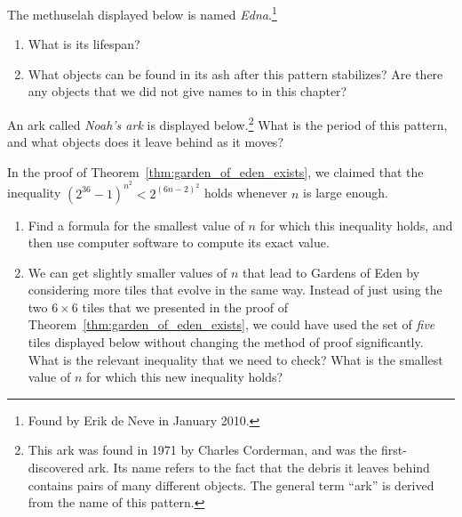 \begin{multicols}{2}
\mfilbreak


\begin{problem}\label{exer:edna}
The methuselah displayed below is named \emph{Edna}.\footnote{Found by Erik de Neve in January 2010.}

\begin{center}
\end{center}

\begin{enumerate}[label=\bf\color{ocre}(\alph*)]
	\item What is its lifespan?
	
	\item What objects can be found in its ash after this pattern stabilizes? Are there any objects that we did not give names to in this chapter?
\end{enumerate}
\end{problem}


\mfilbreak


\begin{problem}\label{exer:noahs_ark}
	An ark called \emph{Noah's ark} is displayed below.\footnote{This ark was found in 1971 by Charles Corderman, and was the first-discovered ark. Its name refers to the fact that the debris it leaves behind contains pairs of many different objects. The general term ``ark'' is derived from the name of this pattern.} What is the period of this pattern, and what objects does it leave behind as it moves?
	
	\begin{center}
	\end{center}
\end{problem}


\mfilbreak


\begin{problemstar}\label{exer:goe_theorem}
In the proof of Theorem~\ref{thm:garden_of_eden_exists}, we claimed that the inequality $(2^{36}-1)^{n^2} < 2^{(6n-2)^2}$ holds whenever $n$ is large enough.\smallskip

\begin{enumerate}[label=\bf\color{ocre}(\alph*)]
	\item Find a formula for the smallest value of $n$ for which this inequality holds, and then use computer software to compute its exact value.
	
	\item We can get slightly smaller values of $n$ that lead to Gardens of Eden by considering more tiles that evolve in the same way. Instead of just using the two $6 \times 6$ tiles that we presented in the proof of Theorem~\ref{thm:garden_of_eden_exists}, we could have used the set of \emph{five} tiles displayed below without changing the method of proof significantly. What is the relevant inequality that we need to check? What is the smallest value of $n$ for which this new inequality holds?
	

\end{enumerate}
\end{problemstar}
\end{multicols}
